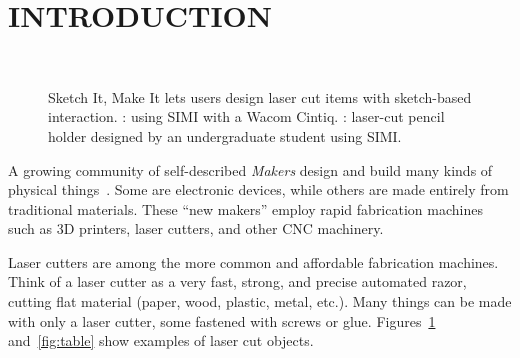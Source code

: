 \documentclass{article}
\begin{document}
\section{INTRODUCTION}

\begin{figure}[h]
\centering 
{}
\\
\caption{Sketch It, Make It lets users design laser cut items with
  sketch-based interaction. : using SIMI with a
  Wacom Cintiq. : laser-cut pencil
  holder designed by an undergraduate student using SIMI.}
\label{fig:simi-intro}
\end{figure}

A growing community of self-described \textit{Makers} design and build
many kinds of physical things~\cite{gershenfeld-fab}. Some are
electronic devices, while others are made entirely from traditional
materials. These ``new makers'' employ rapid fabrication machines such
as 3D printers, laser cutters, and other CNC machinery.

Laser cutters are among the more common and affordable fabrication
machines. Think of a laser cutter as a very fast, strong, and precise
automated razor, cutting flat material (paper, wood, plastic, metal,
etc.). Many things can be made with only a laser cutter, some fastened
with screws or glue. Figures~\ref{fig:simi-intro} and~\ref{fig:table}
show examples of laser cut objects.
\end{document}
